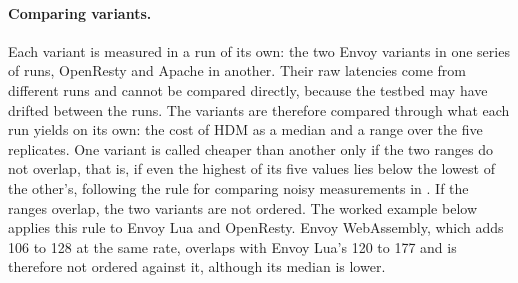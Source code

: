 \documentclass{rptuma}
\begin{document}
\paragraph{Comparing variants.} Each variant is measured in a run of its own: the two Envoy
variants in one series of runs, OpenResty and Apache in another. Their raw latencies come
from different runs and cannot be compared directly, because the testbed may have drifted between
the runs. The variants are therefore compared through what each run yields on its own: the cost of
HDM as a median and a range over the five replicates. One variant is called cheaper than another
only if the two ranges do not overlap, that is, if even the highest of its five values lies below the
lowest of the other's, following the rule for comparing noisy measurements in
. If the ranges
overlap, the two variants are not ordered. The worked example below applies this rule to Envoy Lua
and OpenResty. Envoy WebAssembly, which adds 106 to 128\us{} at the same rate, overlaps with Envoy
Lua's 120 to 177\us{} and is therefore not ordered against it, although its median is lower.
\end{document}
